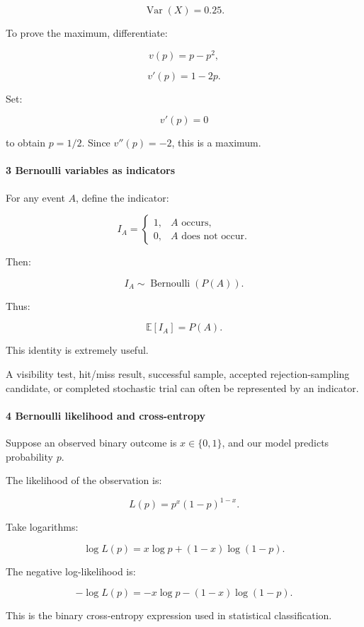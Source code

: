 \[
 \operatorname{Var}(X)=0.25.
\]

To prove the maximum, differentiate:

\[
 v(p)=p-p^2,
\]

\[
 v'(p)=1-2p.
\]

Set:

\[
 v'(p)=0
\]

to obtain \(p=1/2\). Since \(v''(p)=-2\), this is a maximum.

\paragraph{3 Bernoulli variables as indicators}\label{bernoulli-variables-as-indicators}

For any event \(A\), define the indicator:

\[
 I_A= \begin{cases} 1,&A\text{ occurs},\\ 0,&A\text{ does not occur}. \end{cases}
\]

Then:

\[
 I_A\sim\operatorname{Bernoulli}(P(A)).
\]

Thus:

\[
 \boxed{\mathbb E[I_A]=P(A)}.
\]

This identity is extremely useful.

A visibility test, hit/miss result, successful sample, accepted rejection-sampling candidate, or completed stochastic trial can often be represented by an indicator.

\paragraph{4 Bernoulli likelihood and cross-entropy}\label{bernoulli-likelihood-and-cross-entropy}

Suppose an observed binary outcome is \(x\in\{0,1\}\), and our model predicts probability \(p\).

The likelihood of the observation is:

\[
 L(p)=p^x(1-p)^{1-x}.
\]

Take logarithms:

\[
 \log L(p)= x\log p+(1-x)\log(1-p).
\]

The negative log-likelihood is:

\[
 \boxed{ -\log L(p)= -x\log p-(1-x)\log(1-p) }.
\]

This is the binary cross-entropy expression used in statistical classification.


